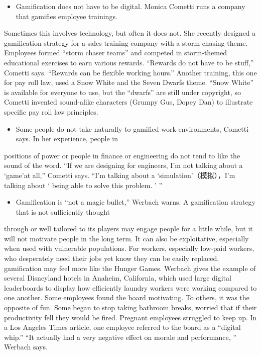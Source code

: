 \documentclass[UTF8,11pt]{ctexart}
\begin{document}
\begin{itemize}[leftmargin=2em,itemsep=.2em,topsep=.4em]\item[H.] Gamification does not have to be digital. Monica Cometti runs a company that gamifies employee trainings.
\end{itemize}

Sometimes this involves technology, but often it does not. She recently designed a gamification strategy for a sales training company with a storm-chasing theme. Employees formed “storm chaser teams” and competed in storm-themed educational exercises to earn various rewards. “Rewards do not have to be stuff,” Cometti says. “Rewards can be flexible working hours.” Another training, this one for pay roll law, used a Snow White and the Seven Dwarfs theme. “Snow White” is available for everyone to use, but the “dwarfs” are still under copyright, so Cometti invented sound-alike characters (Grumpy Gus, Dopey Dan) to illustrate specific pay roll law principles.


\begin{itemize}[leftmargin=2em,itemsep=.2em,topsep=.4em]\item[I.] Some people do not take naturally to gamified work environments, Cometti says. In her experience, people in
\end{itemize}

positions of power or people in finance or engineering do not tend to like the sound of the word. “If we are designing for engineers, I’m not talking about a ‘game’at all,” Cometti says. “I’m talking about a ‘simulation’（模拟），I’m talking about ‘ being able to solve this problem. ’ ”


\begin{itemize}[leftmargin=2em,itemsep=.2em,topsep=.4em]\item[J.] Gamification is “not a magic bullet,” Werbach warns. A gamification strategy that is not sufficiently thought
\end{itemize}

through or well tailored to its players may engage people for a little while, but it will not motivate people in the long term. It can also be exploitative, especially when used with vulnerable populations. For workers, especially low-paid workers, who desperately need their jobs yet know they can be easily replaced, gamification may feel more like the Hunger Games. Werbach gives the example of several Disneyland hotels in Anaheim, California, which used large digital leaderboards to display how efficiently laundry workers were working compared to one another. Some employees found the board motivating. To others, it was the opposite of fun. Some began to stop taking bathroom breaks, worried that if their productivity fell they would be fired. Pregnant employees struggled to keep up. In a Los Angeles Times article, one employee referred to the board as a “digital whip.” “It actually had a very negative effect on morale and performance, ” Werbach says.
\end{document}
